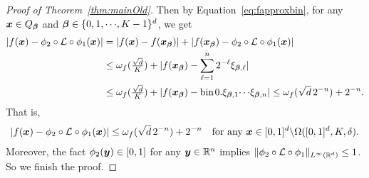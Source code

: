 \documentclass[nohyperref]{article}
\theoremstyle{plain}
\theoremstyle{definition}
\theoremstyle{remark}
\begin{document}
\begin{proof}[Proof of Theorem~\ref{thm:mainOld}]
	Then by Equation~\eqref{eq:fapproxbin}, for any ${\bm{x}}\in Q_{\bm{\beta}}$ and $\bmbeta\in\{0,1,\cdots,K-1\}^d$, we get
	\begin{equation*}
		\begin{split}
			|f(\bmx)-\phi_2\circ \calL \circ \phi_1(\bmx)|
			&= |f(\bmx)-f(\bmx_\bmbeta)|+|f(\bmx_\bmbeta)-\phi_2\circ \calL \circ \phi_1(\bmx)|\\
			&\le \omega_f(\tfrac{\sqrt{d}}{K})+|f(\bmx_\bmbeta)-\sum_{\ell=1}^{n}2^{-\ell}\xi_{\bmbeta,\ell}|\\
			&\le \omega_f(\tfrac{\sqrt{d}}{K})+|f(\bmx_\bmbeta)-\bin 0.\xi_{\bmbeta,1}\cdots\xi_{\bmbeta,n}|\le \omega_f(\sqrt{d}\, 2^{-n})+2^{-n}.
		\end{split}
	\end{equation*}
	That is, 
	\begin{equation*}
		\begin{split}
			|f({\bm{x}})-\phi_2\circ {\mathcal{L}} \circ \phi_1({\bm{x}})|\le \omega_f(\sqrt{d}\, 2^{-n})+2^{-n}\quad \textnormal{for any ${\bm{x}}\in [0,1]^d\backslash \Omega([0,1]^d,K,\delta)$}.
		\end{split}
	\end{equation*}
	Moreover, the fact $\phi_2({\bm{y}})\in [0,1]$ for any $\bmy\in\R^n$ implies $\|\phi_2\circ\calL\circ\phi_1\|_{L^\infty(\R^d)}\le 1$.
	So we finish the proof.
\end{proof}


\end{document}
